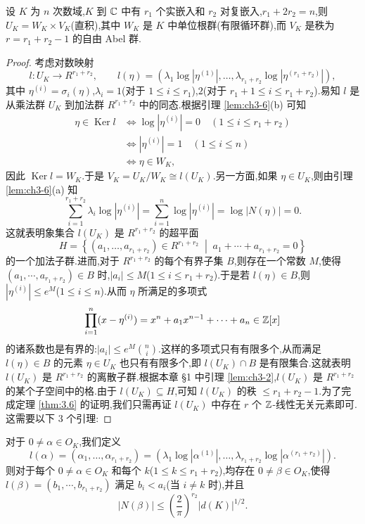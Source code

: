 \begin{theorem}\label{thm:3.6}
设 $K$ 为 $n$ 次数域,$K$ 到 $\mathbb{C}$ 中有 $r_1$ 个实嵌入和 $r_2$ 对复嵌入,$r_1+2r_2=n$,则 $U_K=W_K\times V_K$(直积),其中 $W_K$ 是 $K$ 中单位根群(有限循环群),而 $V_K$ 是秩为 $r=r_1+r_2-1$ 的自由 Abel 群.
\end{theorem}

\begin{proof}
考虑对数映射
\[
  l\colon U_K\to R^{r_1+r_2},\qquad
  l(\eta)=\left(\lambda_1\log|\eta^{(1)}|,\dots,\lambda_{r_1+r_2}\log|\eta^{(r_1+r_2)}|\right),
\]
其中 $\eta^{(i)}=\sigma_i(\eta)$,$\lambda_i=1$(对于 $1\leqslant i\leqslant r_1$),$2$(对于 $r_1+1\leqslant i\leqslant r_1+r_2$).易知 $l$ 是从乘法群 $U_K$ 到加法群 $R^{r_1+r_2}$ 中的同态.根据引理 \ref{lem:ch3-6}(b) 可知
\begin{align*}
  \eta\in\operatorname{Ker}l
  &\Leftrightarrow\log|\eta^{(i)}|=0\quad(1\leqslant i\leqslant r_1+r_2)\\
  &\Leftrightarrow|\eta^{(i)}|=1\quad(1\leqslant i\leqslant n)\\
  &\Leftrightarrow\eta\in W_K,
\end{align*}
因此 $\operatorname{Ker}l=W_K$.于是 $V_K=U_K/W_K\cong l(U_K)$.另一方面,如果 $\eta\in U_K$,则由引理 \ref{lem:ch3-6}(a) 知
\[
  \sum_{i=1}^{r_1+r_2}\lambda_i\log|\eta^{(i)}|
  =\sum_{i=1}^{n}\log|\eta^{(i)}|=\log|N(\eta)|=0.
\]
这就表明象集合 $l(U_K)$ 是 $R^{r_1+r_2}$ 的超平面
\[
  H=\left\{(a_1,\dots,a_{r_1+r_2})\in R^{r_1+r_2}\;\middle|\;a_1+\cdots+a_{r_1+r_2}=0\right\}
\]
的一个加法子群.进而,对于 $R^{r_1+r_2}$ 的每个有界子集 $B$,则存在一个常数 $M$,使得 $(a_1,\cdots,a_{r_1+r_2})\in B$ 时,$|a_i|\leqslant M$($1\leqslant i\leqslant r_1+r_2$).于是若 $l(\eta)\in B$,则 $|\eta^{(i)}|\leqslant e^M$($1\leqslant i\leqslant n$).从而 $\eta$ 所满足的多项式
\[
  \prod_{i=1}^{n}(x-\eta^{(i)})=x^n+a_1x^{n-1}+\cdots+a_n\in\mathbb{Z}[x]
\]
的诸系数也是有界的:$|a_i|\leqslant e^M\binom{n}{i}$.这样的多项式只有有限多个,从而满足 $l(\eta)\in B$ 的元素 $\eta\in U_K$ 也只有有限多个,即 $l(U_K)\cap B$ 是有限集合.这就表明 $l(U_K)$ 是 $R^{r_1+r_2}$ 的离散子群.根据本章 §1 中引理 \ref{lem:ch3-2},$l(U_K)$ 是 $R^{r_1+r_2}$ 的某个子空间中的格.由于 $l(U_K)\subseteq H$,可知 $l(U_K)$ 的秩 $\leqslant r_1+r_2-1$.为了完成定理 \ref{thm:3.6} 的证明,我们只需再证 $l(U_K)$ 中存在 $r$ 个 $\mathbb{Z}$-线性无关元素即可.这需要以下 $3$ 个引理:
\end{proof}

\begin{lemma}\label{lem:ch3-7}
对于 $0\neq\alpha\in O_K$,我们定义
\[
  l(\alpha)=(\alpha_1,\dots,\alpha_{r_1+r_2})
  =\left(\lambda_1\log|\alpha^{(1)}|,\dots,\lambda_{r_1+r_2}\log|\alpha^{(r_1+r_2)}|\right).
\]
则对于每个 $0\neq\alpha\in O_K$ 和每个 $k$($1\leqslant k\leqslant r_1+r_2$),均存在 $0\neq\beta\in O_K$,使得 $l(\beta)=(b_1,\cdots,b_{r_1+r_2})$ 满足 $b_i<a_i$(当 $i\neq k$ 时),并且
\[
  |N(\beta)|\leqslant\left(\frac{2}{\pi}\right)^{r_2}|d(K)|^{1/2}.
\]
\end{lemma}

